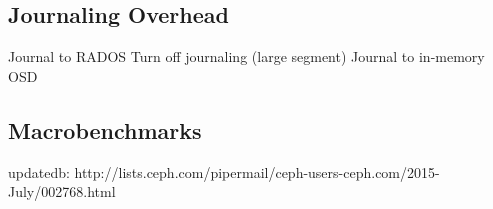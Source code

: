 \documentclass[preprint]{sigplanconf-eurosys}
\begin{document}
%
%
%
%
%
%
%
%
%
%
%

\subsection{Journaling Overhead}

Journal to RADOS
Turn off journaling (large segment)
Journal to in-memory OSD 

\subsection{Macrobenchmarks}
updatedb: http://lists.ceph.com/pipermail/ceph-users-ceph.com/2015-July/002768.html



\end{document}
